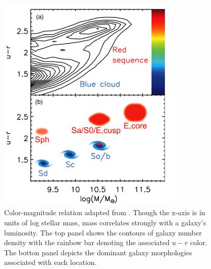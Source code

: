

\begin{figure}
\centering
\includegraphics[width=3.5in]{Figures/kormendy_CMR.png}
\caption[Galaxy color-magnitude relation.]{Color-magnitude relation adapted from \cite{Kormendy2012}. Though the x-axis is in units of log stellar mass, mass correlates strongly with a galaxy's luminosity. The top panel shows the contours of galaxy number density \citep{Baldry2004b} with the rainbow bar denoting the associated $u-r$ color. The botton panel depicts the dominant galaxy morphologies associated with each location.}
\label{fig: CMR}
\end{figure}


